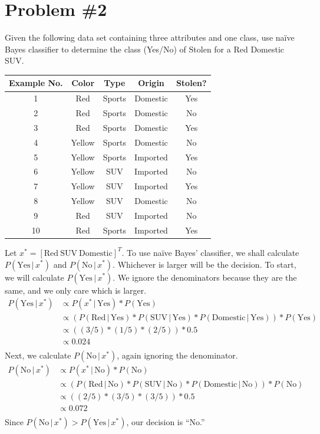 \documentclass[12pt]{article}
\begin{document}
	\section*{Problem \#2}
	Given the following data set containing three attributes and one class, use na\"ive Bayes classifier to determine the class (Yes/No) of Stolen for a Red Domestic SUV.
	\begin{center}
		\begin{tabular*}{280pt}[t]{c |c c c | c}
			Example No. & Color & Type & Origin & Stolen? \\
			\hline \hline
			1 & Red & Sports & Domestic & Yes \\
			2 & Red & Sports & Domestic & No \\
			3 & Red & Sports & Domestic & Yes \\
			4 & Yellow & Sports & Domestic & No \\
			5 & Yellow & Sports & Imported & Yes \\
			6 & Yellow & SUV & Imported & No \\
			7 & Yellow & SUV & Imported & Yes \\
			8 & Yellow & SUV & Domestic & No \\
			9 & Red & SUV & Imported & No \\
			10 & Red & Sports & Imported & Yes \\
		\end{tabular*}
	\end{center}
	Let $x^* = [\text{Red} \ \text{SUV} \ \text{Domestic}]^T$. To use na\"ive Bayes' classifier, we shall calculate $P(\text{Yes} \, \vert \, x^*)$ and $P(\text{No} \, \vert \, x^*)$. Whichever is larger will be the decision. To start, we will calculate $P(\text{Yes} \, \vert \, x^*)$. We ignore the denominators because they are the same, and we only care which is larger.
	\begin{align*}
	P(\text{Yes} \, \vert \, x^*) &\propto P(x^* \, \vert \, \text{Yes}) * P(\text{Yes}) \\
	&\propto (P(\text{Red} \, \vert \, \text{Yes}) * P(\text{SUV} \, \vert \, \text{Yes}) * P(\text{Domestic} \, \vert \, \text{Yes})) * P(\text{Yes}) \\
	&\propto ((3/5)*(1/5)*(2/5))*0.5\\
	&\propto 0.024 \\
	\end{align*}
	Next, we calculate $P(\text{No} \, \vert \, x^*)$, again ignoring the denominator.
	\begin{align*}
	P(\text{No} \, \vert \, x^*) &\propto P(x^* \, \vert \, \text{No}) * P(\text{No}) \\
	&\propto (P(\text{Red} \, \vert \, \text{No}) * P(\text{SUV} \, \vert \, \text{No}) * P(\text{Domestic} \, \vert \, \text{No})) * P(\text{No}) \\
	&\propto ((2/5)*(3/5)*(3/5))*0.5\\
	&\propto 0.072 \\
	\end{align*}
	Since $P(\text{No} \, \vert \, x^*) > P(\text{Yes} \, \vert \, x^*)$, our decision is  ``No.''
	
\end{document}
